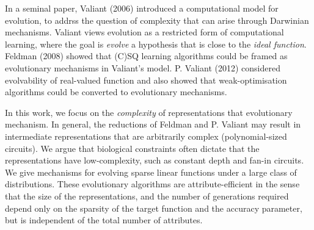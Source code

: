 In a seminal paper, Valiant (2006) introduced a computational model for
evolution, to addrss the question of complexity that can arise through Darwinian
mechanisms. Valiant views evolution as a restricted form of computational
learning, where the goal is \emph{evolve} a hypothesis that is close to the
\emph{ideal function}. Feldman (2008) showed that (C)SQ learning algorithms
could be framed as evolutionary mechanisms in Valiant's model. P. Valiant (2012)
considered evolvability of real-valued function and also showed that
weak-optimisation algorithms could be converted to evolutionary mechanisms.

In this work, we focus on the \emph{complexity} of representations that
evolutionary mechanism. In general, the reductions of Feldman and P. Valiant may
result in intermediate representations that are arbitrarily complex
(polynomial-sized circuits). We argue that biological constraints often dictate
that the representations have low-complexity, such as constant depth and fan-in
circuits.  We give mechanisms for evolving sparse linear functions under a large
class of distributions. These evolutionary algorithms are attribute-efficient in
the sense that the size of the representations, and the number of generations
required depend only on the sparsity of the target function and the accuracy
parameter, but is independent of the total number of attributes.

